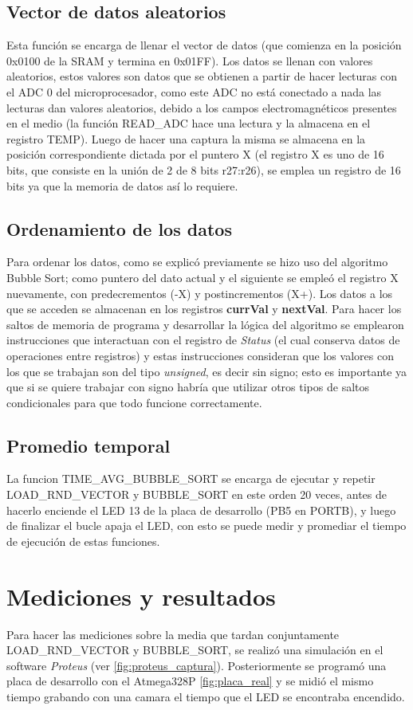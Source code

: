 \documentclass[letterpaper, 10 pt, conference]{ieeeconf}  %
\begin{document}
\subsection{Vector de datos aleatorios}
Esta función se encarga de llenar el vector de datos (que comienza en la posición 0x0100 de la SRAM y termina en 0x01FF). Los datos se llenan con valores aleatorios, estos valores son datos que se obtienen a partir de hacer lecturas con el ADC 0 del microprocesador, como este ADC no está conectado a nada las lecturas dan valores aleatorios, debido a los campos electromagnéticos presentes en el medio (la función READ\_ADC hace una lectura y la almacena en el registro TEMP). Luego de hacer una captura la misma se almacena en la posición correspondiente dictada por el puntero X (el registro X es uno de 16 bits, que consiste en la unión de 2 de 8 bits r27:r26), se emplea un registro de 16 bits ya que la memoria de datos así lo requiere.

\subsection{Ordenamiento de los datos}
Para ordenar los datos, como se explicó previamente se hizo uso del algoritmo Bubble Sort; como puntero del dato actual y el siguiente se empleó el registro X nuevamente, con predecrementos (-X) y postincrementos (X+). Los datos a los que se acceden se almacenan en los registros \textbf{currVal} y \textbf{nextVal}. Para hacer los saltos de memoria de programa y desarrollar la lógica del algoritmo se emplearon instrucciones que interactuan con el registro de \textit{Status} (el cual conserva datos de operaciones entre registros) y estas instrucciones consideran que los valores con los que se trabajan son del tipo \textit{unsigned}, es decir sin signo; esto es importante ya que si se quiere trabajar con signo habría que utilizar otros tipos de saltos condicionales para que todo funcione correctamente.

\subsection{Promedio temporal}
La funcion TIME\_AVG\_BUBBLE\_SORT se encarga de ejecutar y repetir LOAD\_RND\_VECTOR y BUBBLE\_SORT en este orden 20 veces, antes de hacerlo enciende el LED 13 de la placa de desarrollo (PB5 en PORTB), y luego de finalizar el bucle apaja el LED, con esto se puede medir y promediar el tiempo de ejecución de estas funciones.

\section{Mediciones y resultados}
Para hacer las mediciones sobre la media que tardan conjuntamente LOAD\_RND\_VECTOR y BUBBLE\_SORT, se realizó una simulación en el software \textit{Proteus} (ver \ref{fig:proteus_captura}). Posteriormente se programó una placa de desarrollo con el Atmega328P \ref{fig:placa_real} y se midió el mismo tiempo grabando con una camara el tiempo que el LED se encontraba encendido.
\end{document}
